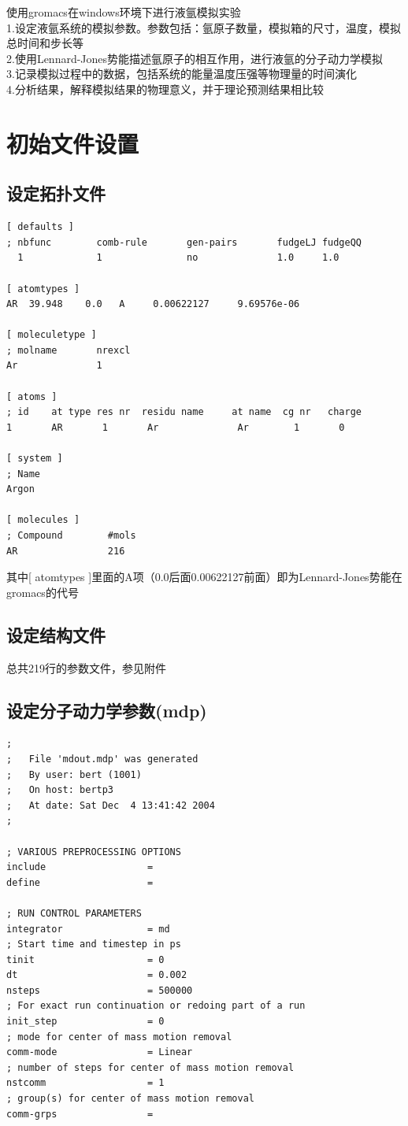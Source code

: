 \documentclass[12pt, a4paper, oneside]{ctexart}
\begin{document}
\begin{spacing}{2.0}
使用gromacs在windows环境下进行液氩模拟实验\\
1.设定液氩系统的模拟参数。参数包括：氩原子数量，模拟箱的尺寸，温度，模拟总时间和步长等\\
2.使用Lennard-Jones势能描述氩原子的相互作用，进行液氩的分子动力学模拟\\
3.记录模拟过程中的数据，包括系统的能量温度压强等物理量的时间演化\\
4.分析结果，解释模拟结果的物理意义，并于理论预测结果相比较\\
\section{初始文件设置}
\subsection{设定拓扑文件}
\begin{lstlisting}[caption={argon.top}]
    [ defaults ]
; nbfunc        comb-rule       gen-pairs       fudgeLJ fudgeQQ
  1             1               no              1.0     1.0

[ atomtypes ]
AR  39.948    0.0   A     0.00622127     9.69576e-06

[ moleculetype ]
; molname       nrexcl
Ar              1

[ atoms ]
; id    at type res nr  residu name     at name  cg nr   charge
1       AR       1       Ar              Ar        1       0

[ system ]
; Name
Argon

[ molecules ]
; Compound        #mols
AR                216
\end{lstlisting}
其中[ atomtypes ]里面的A项（0.0后面0.00622127前面）即为Lennard-Jones势能在gromacs的代号
\subsection{设定结构文件}
总共219行的参数文件，参见附件
\subsection{设定分子动力学参数(mdp)}
\begin{lstlisting}[caption={94k.mdp}]
    ;
;	File 'mdout.mdp' was generated
;	By user: bert (1001)
;	On host: bertp3
;	At date: Sat Dec  4 13:41:42 2004
;

; VARIOUS PREPROCESSING OPTIONS
include                  = 
define                   = 

; RUN CONTROL PARAMETERS
integrator               = md
; Start time and timestep in ps
tinit                    = 0
dt                       = 0.002
nsteps                   = 500000
; For exact run continuation or redoing part of a run
init_step                = 0
; mode for center of mass motion removal
comm-mode                = Linear
; number of steps for center of mass motion removal
nstcomm                  = 1
; group(s) for center of mass motion removal
comm-grps                = 


\end{lstlisting}
\end{spacing}
\end{document}

